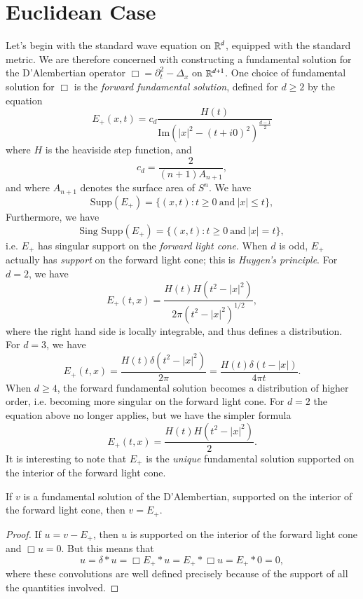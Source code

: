 \section{Euclidean Case}

Let's begin with the standard wave equation on $\operatorname{\mathbb{R}}^d$, equipped with the standard metric. We are therefore concerned with constructing a fundamental solution for the D'Alembertian operator $\Box = \partial_t^2 - \Delta_x$ on $\operatorname{\mathbb{R}}^{d + 1}$. One choice of fundamental solution for $\Box$ is the \emph{forward fundamental solution}, defined for $d \geq 2$ by the equation
%
\[ E_+(x,t) = c_d \frac{H(t)}{\text{Im}(|x|^2 - (t + i0)^2)^{\frac{d-1}{2}}} \]
%
where $H$ is the heaviside step function, and
%
\[ c_d = \frac{2}{(n+1) A_{n+1}}, \]
%
and where $A_{n+1}$ denotes the surface area of $S^n$. We have
%
\[ \text{Supp}(E_+) = \{ (x,t): t \geq 0\ \text{and}\ |x| \leq t \}, \]
%
Furthermore, we have
%
\[ \text{Sing\ Supp}(E_+) = \{ (x,t): t \geq 0\ \text{and}\ |x| = t \}, \]
%
i.e. $E_+$ has singular support on the \emph{forward light cone}. When $d$ is odd, $E_+$ actually has \emph{support} on the forward light cone; this is \emph{Huygen's principle}. For $d = 2$, we have
%
\[ E_+(t,x) = \frac{H(t) H(t^2 - |x|^2)}{2 \pi (t^2 - |x|^2)^{1/2}}, \]
%
where the right hand side is locally integrable, and thus defines a distribution. For $d = 3$, we have
%
\[ E_+(t,x) = \frac{H(t) \delta(t^2 - |x|^2)}{2 \pi} = \frac{H(t) \delta(t - |x|)}{4 \pi t}. \]
%
When $d \geq 4$, the forward fundamental solution becomes a distribution of higher order, i.e. becoming more singular on the forward light cone. For $d = 2$ the equation above no longer applies, but we have the simpler formula
%
\[ E_+(t,x) = \frac{H(t) H(t^2 - |x|^2)}{2}. \]
%
It is interesting to note that $E_+$ is the \emph{unique} fundamental solution supported on the interior of the forward light cone.

\begin{lemma}
    If $v$ is a fundamental solution of the D'Alembertian, supported on the interior of the forward light cone, then $v = E_+$.
\end{lemma}
\begin{proof}
    If $u = v - E_+$, then $u$ is supported on the interior of the forward light cone and $\Box u = 0$. But this means that
    \[ u = \delta * u = \Box E_+ * u = E_+ * \Box u = E_+ * 0 = 0, \]
    where these convolutions are well defined precisely because of the support of all the quantities involved.
\end{proof}

